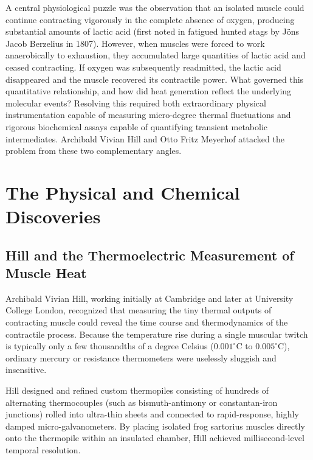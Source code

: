 A central physiological puzzle was the observation that an isolated muscle could continue contracting vigorously in the complete absence of oxygen, producing substantial amounts of lactic acid (first noted in fatigued hunted stags by Jöns Jacob Berzelius in 1807). However, when muscles were forced to work anaerobically to exhaustion, they accumulated large quantities of lactic acid and ceased contracting. If oxygen was subsequently readmitted, the lactic acid disappeared and the muscle recovered its contractile power. What governed this quantitative relationship, and how did heat generation reflect the underlying molecular events? Resolving this required both extraordinary physical instrumentation capable of measuring micro-degree thermal fluctuations and rigorous biochemical assays capable of quantifying transient metabolic intermediates. Archibald Vivian Hill and Otto Fritz Meyerhof attacked the problem from these two complementary angles.

\section{The Physical and Chemical Discoveries}

\subsection{Hill and the Thermoelectric Measurement of Muscle Heat}

Archibald Vivian Hill, working initially at Cambridge and later at University College London, recognized that measuring the tiny thermal outputs of contracting muscle could reveal the time course and thermodynamics of the contractile process. Because the temperature rise during a single muscular twitch is typically only a few thousandths of a degree Celsius ($0.001^\circ\text{C}$ to $0.005^\circ\text{C}$), ordinary mercury or resistance thermometers were uselessly sluggish and insensitive.

Hill designed and refined custom thermopiles consisting of hundreds of alternating thermocouples (such as bismuth-antimony or constantan-iron junctions) rolled into ultra-thin sheets and connected to rapid-response, highly damped micro-galvanometers. By placing isolated frog sartorius muscles directly onto the thermopile within an insulated chamber, Hill achieved millisecond-level temporal resolution. 


